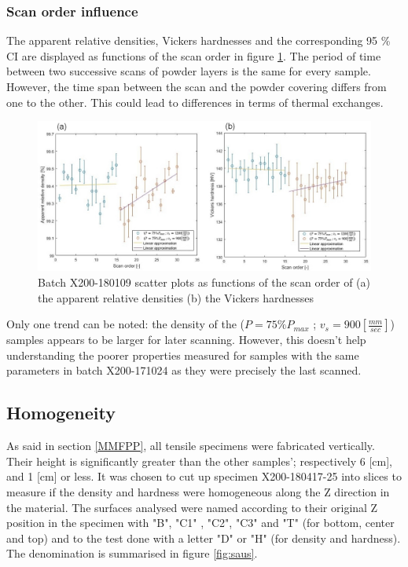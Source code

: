 \subsubsection{Scan order influence}
The apparent relative densities, Vickers hardnesses and the corresponding 95 \% CI are displayed as functions of the scan order in figure \ref{fig:180109-SO}. The period of time between two successive scans of powder layers is the same for every sample. However, the time span between the scan and the powder covering differs from one to the other. This could lead to differences in terms of thermal exchanges.\\

\begin{figure}[ht]
\centering
\centerline{\includegraphics[scale=0.62]{Images/180109-SO}}
\decoRule
\caption[Batch X200-180109 scatter plots as functions of the scan order of (a) the apparent relative densities (b) the Vickers hardnesses]{Batch X200-180109 scatter plots as functions of the scan order of (a) the apparent relative densities (b) the Vickers hardnesses}
\label{fig:180109-SO}
\end{figure} 

Only one trend can be noted: the density of the ($P=75\% P_{max}$ ; $v_s=900 [\frac{mm}{sec}]$) samples appears to be larger for later scanning. However, this doesn't help understanding the poorer properties measured for samples with the same parameters in batch X200-171024 as they were precisely the last scanned. \\

\subsection{Homogeneity}
As said in section \ref{MMFPP}, all tensile specimens were fabricated vertically. Their height is significantly greater than the other samples'; respectively 6 [cm], and 1 [cm] or less. It was chosen to cut up specimen X200-180417-25 into slices to measure if the density and hardness were homogeneous along the Z direction in the material. The surfaces analysed were named according to their original Z position in the specimen with "B", "C1" , "C2", "C3" and "T" (for bottom, center and top) and to the test done with a letter "D" or "H"  (for density and hardness). The denomination is summarised in figure \ref{fig:saus}.\\

